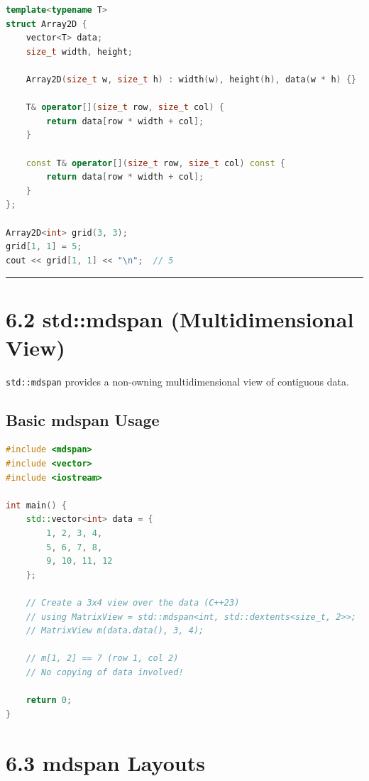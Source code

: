 \begin{lstlisting}[language={C++}]
template<typename T>
struct Array2D {
    vector<T> data;
    size_t width, height;
    
    Array2D(size_t w, size_t h) : width(w), height(h), data(w * h) {}
    
    T& operator[](size_t row, size_t col) {
        return data[row * width + col];
    }
    
    const T& operator[](size_t row, size_t col) const {
        return data[row * width + col];
    }
};

Array2D<int> grid(3, 3);
grid[1, 1] = 5;
cout << grid[1, 1] << "\n";  // 5
\end{lstlisting}

\begin{center}\rule{0.5\linewidth}{0.5pt}\end{center}

\hypertarget{stdmdspan-multidimensional-view}{%
\section{6.2 std::mdspan (Multidimensional
View)}\label{stdmdspan-multidimensional-view}}

\passthrough{\lstinline!std::mdspan!} provides a non-owning
multidimensional view of contiguous data.

\hypertarget{basic-mdspan-usage}{%
\subsection{Basic mdspan Usage}\label{basic-mdspan-usage}}

\begin{lstlisting}[language={C++}]
#include <mdspan>
#include <vector>
#include <iostream>

int main() {
    std::vector<int> data = {
        1, 2, 3, 4,
        5, 6, 7, 8,
        9, 10, 11, 12
    };

    // Create a 3x4 view over the data (C++23)
    // using MatrixView = std::mdspan<int, std::dextents<size_t, 2>>;
    // MatrixView m(data.data(), 3, 4);
    
    // m[1, 2] == 7 (row 1, col 2)
    // No copying of data involved!
    
    return 0;
}
\end{lstlisting}

\hypertarget{mdspan-layouts}{%
\section{6.3 mdspan Layouts}\label{mdspan-layouts}}


